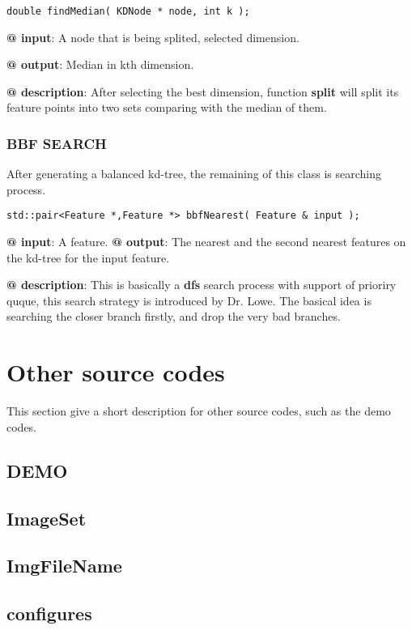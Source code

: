 \documentclass[paper=a4, fontsize=11pt]{scrartcl} %
\numberwithin{equation}{section} %
\numberwithin{figure}{section} %
\numberwithin{table}{section} %
\begin{document}
\begin{lstlisting}
double findMedian( KDNode * node, int k );
\end{lstlisting}

\textbf{@ input}: A node that is being splited, selected dimension.

\textbf{@ output}: Median in kth dimension.

\textbf{@ description}: After selecting the best dimension, function \textbf{split} will split its feature points into two sets comparing with the median of them.  \\

\subsubsection{BBF SEARCH}

After generating a balanced kd-tree, the remaining of this class is searching process.\\

\begin{lstlisting}
std::pair<Feature *,Feature *> bbfNearest( Feature & input );
\end{lstlisting}

\textbf{@ input}: A feature.
\textbf{@ output}: The nearest and the second nearest features on the kd-tree for the input feature.

\textbf{@ description}: This is basically a \textbf{dfs} search process with support of prioriry quque, this search strategy is introduced by Dr. Lowe\cite{sift}. The basical idea is searching the closer branch firstly, and drop the very bad branches.

\section{Other source codes}

This section give a short description for other source codes, such as the demo codes.

\subsection{DEMO}

\subsection{ImageSet}

\subsection{ImgFileName}

\subsection{configures}



\end{document}
